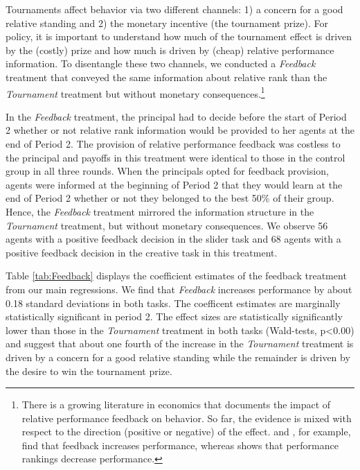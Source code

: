 Tournaments affect behavior via two different channels: 1) a concern for a good relative standing and 
2) the monetary incentive (the tournament prize). For policy, it is important to understand how much of the tournament effect 
is driven by the (costly) prize and how much is driven by (cheap) relative performance information. 
 To disentangle these two channels, we conducted a \textit{Feedback} treatment that conveyed
 the same information about relative rank than the \textit{Tournament} treatment 
but without monetary consequences.\footnote{There is a growing literature in economics that documents 
the impact of relative performance feedback on behavior. So far, the evidence is mixed 
with respect to the direction (positive or negative) of the effect. 
\citet{Azmat2010} and 
\citet{BlanesiVidal2011}, for example, find that feedback increases performance,
 whereas \cite{Barankay2011b} shows that performance rankings decrease performance. 
 } 


In the \textit{Feedback} treatment, the principal had to 
decide before the start of Period 2 whether or not  relative rank information would be provided 
to her agents at the end of Period 2. The provision of relative performance feedback was 
costless to the principal and payoffs in this treatment were identical to those in the 
control group in all three rounds. When the principals opted for feedback provision, 
agents were informed at the beginning of Period 2 that they would learn at the end of Period 2 
whether or not they belonged to the best 50\% of their group. 
Hence, the \textit{Feedback} treatment mirrored the information structure in the \textit{Tournament} treatment, 
but without monetary consequences. 
We observe 56 agents with a positive feedback decision in the slider task and 68 agents 
with a positive feedback decision in the creative task in this treatment.


Table \ref{tab:Feedback} displays the coefficient estimates of the feedback treatment from our main regressions. 
We find that \textit{Feedback} increases performance by about 
0.18 standard deviations in both tasks. 
The coefficent estimates are marginally statistically significant in period 2.
The effect sizes are statistically significantly lower than those in the \textit{Tournament} 
treatment in both tasks (Wald-tests, p<0.00) and suggest that about one fourth of the 
increase in the \textit{Tournament} treatment is driven by
 a concern for a good relative standing while the remainder is driven by the 
desire to win the tournament prize. 


